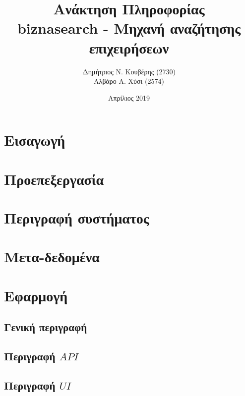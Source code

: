 \documentclass[10pt,a4paper]{article}
\title{%
  \huge \textgreek{Ανάκτηση Πληροφορίας} \\
\large biznasearch - \textgreek{Μηχανή αναζήτησης επιχειρήσεων}}
\author{
    \textgreek{Δημήτριος Ν. Κουβέρης} (2730) \\
    \textgreek{Αλβάρο Α. Χύσι} (2574)
}
\date{\textgreek{Απρίλιος} 2019}
\begin{document}

\maketitle
\newpage

\renewcommand{\contentsname}{\textgreek{Περιεχόμενα}}
\tableofcontents


\newpage
\section{\textgreek{Εισαγωγή}}



\section{\textgreek{Προεπεξεργασία}}



\section{\textgreek{Περιγραφή συστήματος}}



\section{\textgreek{Μετα-δεδομένα}}


\section{\textgreek{Εφαρμογή}}
\subsection{\textgreek{Γενική περιγραφή}}


\subsection{\textgreek{Περιγραφή $API$}}


\subsection{\textgreek{Περιγραφή $UI$}}

\end{document}
